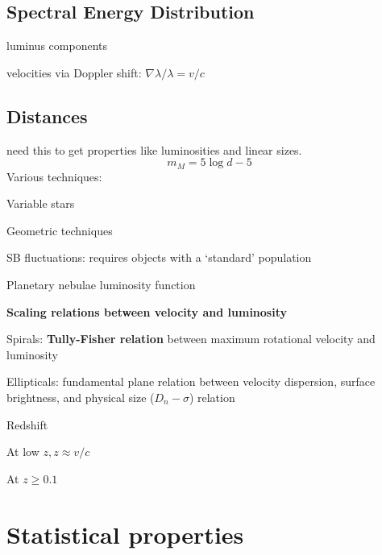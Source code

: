 \documentclass[12pt]{article}
\begin{document}
\subsection*{Spectral Energy Distribution}
\begin{itemize*}
    \item luminus components
    \item velocities via Doppler shift: $\nabla \lambda / \lambda = v/c $
\end{itemize*}


\subsection*{Distances}
need this to get properties like luminosities and linear sizes.
$$    m_M = 5\log{d}-5 $$
Various techniques:
\begin{itemize*}
    \item Variable stars
    \item Geometric techniques
    \item SB fluctuations: requires objects with a `standard' population
    \item Planetary nebulae luminosity function
    \item \textbf{Scaling relations between velocity and luminosity}
    \begin{itemize*}
      \item Spirals: \textbf{Tully-Fisher relation} between maximum
        rotational velocity and luminosity
      \item Ellipticals: fundamental plane relation between velocity
        dispersion, surface brightness, and physical size ($D_n -
        \sigma$) relation
    \end{itemize*}
    \item Redshift
    \begin{itemize*}
      \item At low $z, z \approx v/c$
      \item At $z \geq 0.1$
    \end{itemize*}
\end{itemize*}

\section*{Statistical properties}
\end{document}
